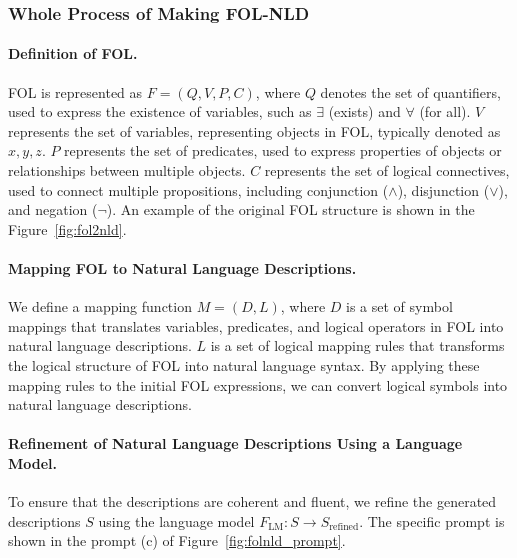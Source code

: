 \subsubsection{Whole Process of Making FOL-NLD}
\label{app:make_fol_nld}
\paragraph{Definition of FOL.}
    FOL is represented as \( F = (Q, V, P, C) \), where 
         \( Q \) denotes the set of quantifiers, used to express the existence of variables, such as \( \exists \) (exists) and \( \forall \) (for all).
         \( V \) represents the set of variables, representing objects in FOL, typically denoted as \( x, y, z \).
         \( P \) represents the set of predicates, used to express properties of objects or relationships between multiple objects.
         \( C \) represents the set of logical connectives, used to connect multiple propositions, including conjunction (\( \land \)), disjunction (\( \lor \)), and negation (\( \neg \)).
    An example of the original FOL structure is shown in the Figure~\ref{fig:fol2nld}.

\paragraph{Mapping FOL to Natural Language Descriptions.}

We define a mapping function \( M = (D, L) \), where \( D \) is a set of symbol mappings that translates variables, predicates, and logical operators in FOL into natural language descriptions. \( L \) is a set of logical mapping rules that transforms the logical structure of FOL into natural language syntax. By applying these mapping rules to the initial FOL expressions, we can convert logical symbols into natural language descriptions.
    
\paragraph{Refinement of Natural Language Descriptions Using a Language Model.} To ensure that the descriptions are coherent and fluent, we refine the generated descriptions \( S \) using the language model \( F_{\text{LM}}: S \rightarrow S_{\text{refined}} \). The specific prompt is shown in the prompt (c) of Figure~\ref{fig:folnld_prompt}. 



